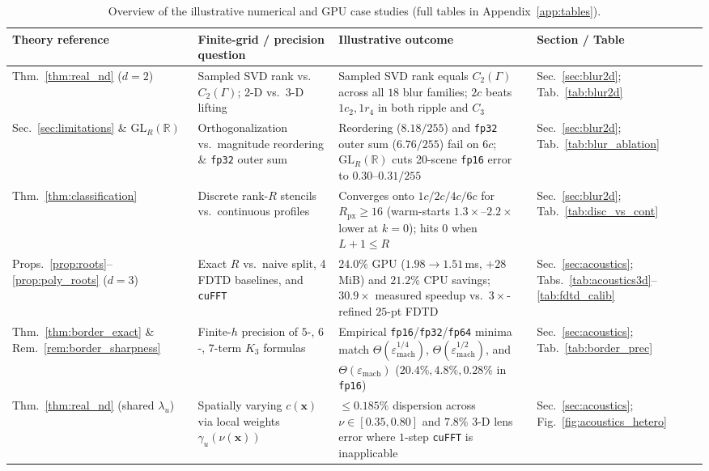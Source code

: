 \documentclass[11pt,a4paper]{article}
\theoremstyle{plain}
\theoremstyle{definition}
\newcommand{\R}{\mathbb{R}}
\begin{document}
\begin{table}[t]
\centering
\caption{Overview of the illustrative numerical and GPU case studies (full tables in Appendix~\ref{app:tables}).}\label{tab:exp_map}
\smallskip
{\scriptsize\setlength{\tabcolsep}{2.2pt}
\begin{tabular}{@{}>{\raggedright\arraybackslash}p{3.2cm}>{\raggedright\arraybackslash}p{3.6cm}>{\raggedright\arraybackslash}p{5.5cm}>{\raggedright\arraybackslash}p{2.5cm}@{}}
\toprule
Theory reference & Finite-grid / precision question & Illustrative outcome & Section / Table \\
\midrule
Thm.~\ref{thm:real_nd} ($d = 2$) & Sampled SVD rank vs.\ $C_2(\Gamma)$; 2-D vs.\ 3-D lifting & Sampled SVD rank equals $C_2(\Gamma)$ across all $18$ blur families; $2c$ beats $1c_2, 1r_4$ in both ripple and $C_3$ & Sec.~\ref{sec:blur2d}; Tab.~\ref{tab:blur2d} \\
Sec.~\ref{sec:limitations} \& $\mathrm{GL}_R(\R)$ & Orthogonalization vs.\ magnitude reordering \& \texttt{fp32} outer sum & Reordering ($8.18/255$) and \texttt{fp32} outer sum ($6.76/255$) fail on $6c$; $\mathrm{GL}_R(\R)$ cuts 20-scene \texttt{fp16} error to $0.30\text{--}0.31/255$ & Sec.~\ref{sec:blur2d}; Tab.~\ref{tab:blur_ablation} \\
Thm.~\ref{thm:classification} & Discrete rank-$R$ stencils vs.\ continuous profiles & Converges onto $1c/2c/4c/6c$ for $R_{\mathrm{px}} \ge 16$ (warm-starts $1.3\times\text{--}2.2\times$ lower at $k{=}0$); hits $0$ when $L{+}1 \le R$ & Sec.~\ref{sec:blur2d}; Tab.~\ref{tab:disc_vs_cont} \\
Props.~\ref{prop:roots}--\ref{prop:poly_roots} ($d = 3$) & Exact $R$ vs.\ naive split, 4 FDTD baselines, and \texttt{cuFFT} & $24.0\%$ GPU ($1.98 \to 1.51$\,ms, $+28$\,MiB) and $21.2\%$ CPU savings; $30.9\times$ measured speedup vs.\ $3\times$-refined $25$-pt FDTD & Sec.~\ref{sec:acoustics}; Tabs.~\ref{tab:acoustics3d}--\ref{tab:fdtd_calib} \\
Thm.~\ref{thm:border_exact} \& Rem.~\ref{rem:border_sharpness} & Finite-$h$ precision of $5$-, $6$-, $7$-term $K_3$ formulas & Empirical \texttt{fp16}/\texttt{fp32}/\texttt{fp64} minima match $\Theta(\varepsilon_{\mathrm{mach}}^{1/4})$, $\Theta(\varepsilon_{\mathrm{mach}}^{1/2})$, and $\Theta(\varepsilon_{\mathrm{mach}})$ ($20.4\%, 4.8\%, 0.28\%$ in \texttt{fp16}) & Sec.~\ref{sec:acoustics}; Tab.~\ref{tab:border_prec} \\
Thm.~\ref{thm:real_nd} (shared $\lambda_u$) & Spatially varying $c(\mathbf{x})$ via local weights $\gamma_u(\nu(\mathbf{x}))$ & $\le 0.185\%$ dispersion across $\nu \in [0.35, 0.80]$ and $7.8\%$ 3-D lens error where $1$-step \texttt{cuFFT} is inapplicable & Sec.~\ref{sec:acoustics}; Fig.~\ref{fig:acoustics_hetero} \\
\bottomrule
\end{tabular}}
\end{table}
\end{document}
